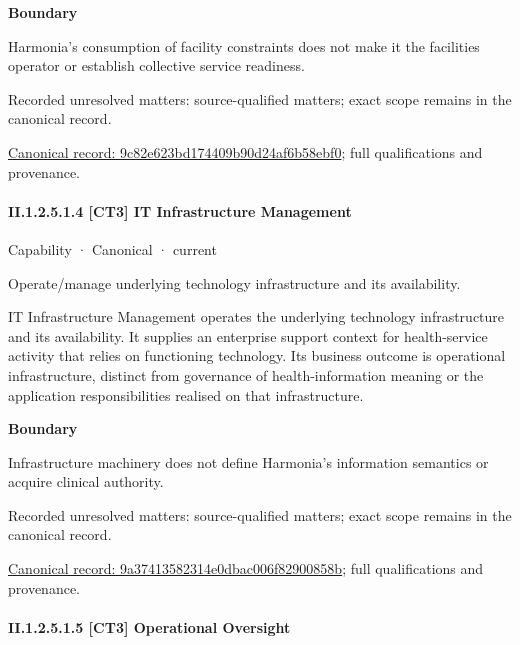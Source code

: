 \textbf{Boundary}



Harmonia's consumption of facility constraints does not make it the facilities operator or establish collective service readiness.


{\small Recorded unresolved matters: source-qualified matters; exact scope remains in the canonical record.}\par
{\footnotesize \href{../../../../../../../continuum/strategy/capability/9c82e623bd174409b90d24af6b58ebf0.md}{Canonical record: 9c82e623bd174409b90d24af6b58ebf0}; full qualifications and provenance.}\par
\paragraph*{II.1.2.5.1.4 [CT3] IT Infrastructure Management}
\label{navigation:II.1.2.5.1.4}

\label{element:9a37413582314e0dbac006f82900858b}
{\small Capability · Canonical · current}\par

Operate/manage underlying technology infrastructure and its availability.



IT Infrastructure Management operates the underlying technology infrastructure and its availability. It supplies an enterprise support context for health-service activity that relies on functioning technology. Its business outcome is operational infrastructure, distinct from governance of health-information meaning or the application responsibilities realised on that infrastructure.



\textbf{Boundary}



Infrastructure machinery does not define Harmonia's information semantics or acquire clinical authority.


{\small Recorded unresolved matters: source-qualified matters; exact scope remains in the canonical record.}\par
{\footnotesize \href{../../../../../../../continuum/strategy/capability/9a37413582314e0dbac006f82900858b.md}{Canonical record: 9a37413582314e0dbac006f82900858b}; full qualifications and provenance.}\par
\paragraph*{II.1.2.5.1.5 [CT3] Operational Oversight}
\label{navigation:II.1.2.5.1.5}

